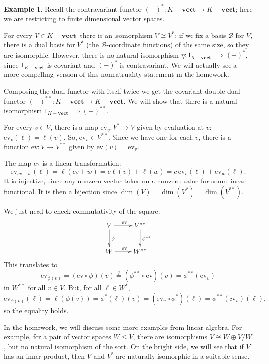 \documentclass{amsart}[12pt]
\def\cB{\mathcal B}
\numberwithin{equation}{section}
\theoremstyle{plain} %
\theoremstyle{definition}
\newtheorem{ex}[equation]{Example}
\theoremstyle{remark}
\newcommand{\vs}[1]{#1-\mathbf{vect}}
\begin{document}
\begin{ex}
Recall the contravariant functor $(-)^*:\vs{K}\to \vs{K}$; here we are restricting to finite dimensional vector spaces. 

For every $V\in \vs{K}$, there is an isomorphism $V\cong V^*$: if we fix a basis $\cB$ for $V$, there is a dual basis for $V^*$ (the $\cB$-coordinate functions) of the same size, so they are isomorphic. However, there is no natural isomorphism $\eta: 1_{\vs{K}} \implies (-)^*$, since $1_{\vs{K}}$ is covariant and $(-)^*$ is contravariant. We will actually see a more compelling version of this nonnatruality statement in the homework.

Composing the dual functor with itself twice we get the covariant double-dual functor $(-)^{**}:\vs{K}\to\vs{K}$. We will show that there is a natural isomorphism $1_{\vs{K}}\implies (-)^{**}$.

For every $v\in V$, there is a map $\mathrm{ev}_v:V^{*}\to V$ given by evaluation at $v$: $\mathrm{ev}_v(\ell) = \ell(v)$. So, $\mathrm{ev}_v\in V^{**}$. Since we have one for each $v$, there is a function $\mathrm{ev}:V\to V^{**}$ given by $\mathrm{ev}(v)=\mathrm{ev}_v$.

The map $\mathrm{ev}$ is a linear transformation:
\[ \mathrm{ev}_{cv+w} (\ell) = \ell(cv+w) = c\ell(v) +\ell(w) = c \,\mathrm{ev}_v(\ell) + \mathrm{ev}_w(\ell).\]
It is injective, since any nonzero vector takes on a nonzero value for some linear functional. It is then a bijection since $\dim(V)=\dim(V^{*})=\dim(V^{**})$.

We just need to check commutativity of the square:
\[\xymatrix{ V \ar[r]^{\mathrm{ev}} \ar[d]^{\phi} & V^{**} \ar[d]^{\phi^{**}} \\ W \ar[r]^{\mathrm{ev}} & W^{**} }\]
This translates to \[ \mathrm{ev}_{\phi(v)} = (\mathrm{ev} \circ \phi) (v) \stackrel{?}{=} (\phi^{**} \circ \mathrm{ev})(v) = \phi^{**}(\mathrm{ev}_v)\]
in $W^{**}$ for all $v\in V$. But, for all $\ell\in W^{*}$,
\[ \mathrm{ev}_{\phi(v)}(\ell)=\ell(\phi(v)) = \phi^*(\ell)(v) = (\mathrm{ev}_v \circ \phi^*)(\ell) = \phi^{**}(\mathrm{ev}_v)(\ell),\]
so the equality holds.
\end{ex}

In the homework, we will discuss some more examples from linear algebra. For example, for a pair of vector spaces $W\leq V$, there are isomorphisms $V\cong W\oplus V/W$, but no natural isomorphism of the sort. On the bright side, we will see that if $V$ has an inner product, then $V$ and $V^*$ are naturally isomorphic in a suitable sense.
\end{document}
